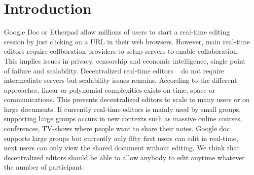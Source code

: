 
\section{Introduction}



Google Doc or Etherpad allow millions of users to start a real-time
editing session by just clicking on a URL in their web
browsers. However, main real-time editors require collboration
providers to setup servers to enable
collaboration. This implies issues in privacy, censorship and economic
intelligence, single point of failure and
scalability.%
Decentralized real-time editors ~\cite{oster2006data,
  sun1998operational, sun2009contextbased} do not require intermediate
servers but scalability issues remains. According to the different
approaches, linear or polynomial complexities exists on time, space or
communications. This prevents decentralized editors to scale to many
users or on large documents. If currently real-time editors is mainly
used by small groups, supporting large groups occurs in new contexts
such as massive online courses, conferences, TV-shows where
people want to share their notes. Google doc supports large groups but
currently only fifty first users can edit in real-time, next users can
only view the shared document without editing. We think that
decentralized editors should be able to allow anybody to edit anytime
whatever the number of participant.


